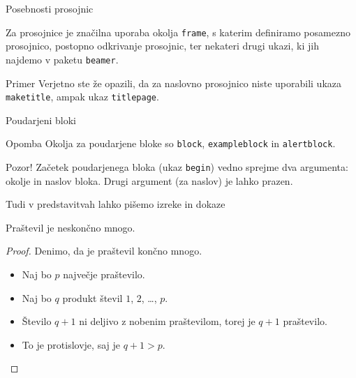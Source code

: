 \begin{frame}{Posebnosti prosojnic}

	Za prosojnice je značilna uporaba okolja \texttt{frame},
	s katerim definiramo posamezno prosojnico,
	\pause
	postopno odkrivanje prosojnic,
	\pause
	ter nekateri drugi ukazi, ki jih najdemo v paketu \texttt{beamer}.
	\pause
	\begin{exampleblock}{Primer}
		Verjetno ste že opazili, da za naslovno prosojnico niste uporabili
		ukaza \texttt{maketitle}, ampak ukaz \texttt{titlepage}.
	\end{exampleblock}
\end{frame}

\begin{frame}{Poudarjeni bloki}

	\begin{block}{Opomba}
		Okolja za poudarjene bloke so \texttt{block}, \texttt{exampleblock} in \texttt{alertblock}.
	\end{block}
	\begin{alertblock}{Pozor!}
		Začetek poudarjenega bloka (ukaz \texttt{begin}) vedno sprejme 
		dva argumenta: okolje in naslov bloka.
		Drugi argument (za naslov) je lahko prazen. 
	\end{alertblock}
\end{frame}

\begin{frame}{Tudi v predstavitvah lahko pišemo izreke in dokaze}

	\begin{izrek}
	   Praštevil je neskončno mnogo.
	\end{izrek}
	\begin{proof}
	   Denimo, da je praštevil končno mnogo.
	   \begin{itemize}
		  \item Naj bo \(p\) največje praštevilo.
		  \pause
		  \item Naj bo \(q\) produkt števil \(1\), \(2\), \ldots, \(p\).
		  \pause
		  \item Število \(q+1\) ni deljivo z nobenim praštevilom, torej je \(q+1\) praštevilo.
		  \pause
		  \item To je protislovje, saj je \(q+1>p\). \qedhere
	   \end{itemize}
	\end{proof}
 \end{frame}
 
